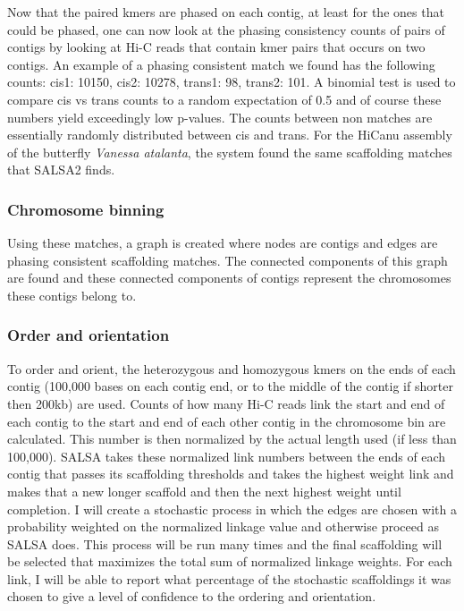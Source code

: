 {\par{
Now that the paired kmers are phased on each contig, at least for the ones that could be phased, one can now look at the phasing consistency counts of pairs of contigs by looking at Hi-C reads that contain kmer pairs that occurs on two contigs. An example of a phasing consistent match we found has the following counts:  cis1: 10150, cis2: 10278, trans1: 98, trans2: 101. A binomial test is used to compare cis vs trans counts to a random expectation of 0.5 and of course these numbers yield exceedingly low p-values. The counts between non matches are essentially randomly distributed between cis and trans. For the HiCanu assembly of the butterfly \textit{Vanessa atalanta}, the system found the same scaffolding matches that SALSA2 finds.
}

\subsubsection{Chromosome binning}

\par{
Using these matches, a graph is created where nodes are contigs and edges are phasing consistent scaffolding matches. The connected components of this graph are found and these connected components of contigs represent the chromosomes these contigs belong to. 
}

\subsubsection{Order and orientation}

\par{
To order and orient, the heterozygous and homozygous kmers on the ends of each contig (100,000 bases on each contig end, or to the middle of the contig if shorter then 200kb) are used. Counts of how many Hi-C reads link the start and end of each contig to the start and end of each other contig in the chromosome bin are calculated. This number is then normalized by the actual length used (if less than 100,000). SALSA takes these normalized link numbers between the ends of each contig that passes its scaffolding thresholds and takes the highest weight link and makes that a new longer scaffold and then the next highest weight until completion. I will create a stochastic process in which the edges are chosen with a probability weighted on the normalized linkage value and otherwise proceed as SALSA does. This process will be run many times and the final scaffolding will be selected that maximizes the total sum of normalized linkage weights. For each link, I will be able to report what percentage of the stochastic scaffoldings it was chosen to give a level of confidence to the ordering and orientation.
}


}
